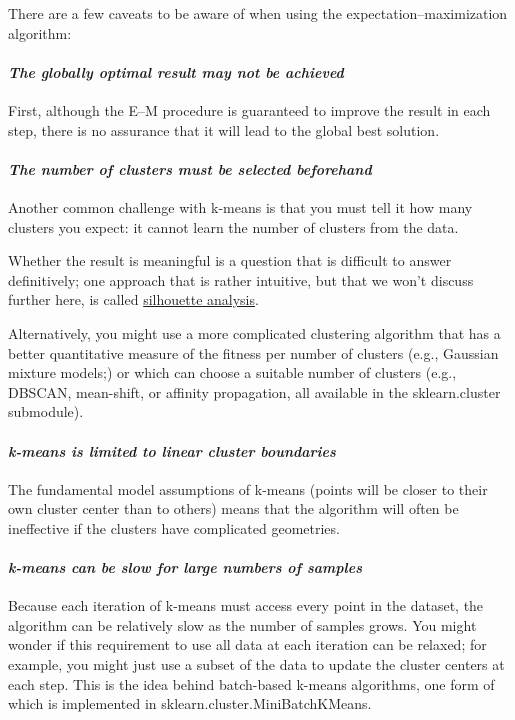 There are a few caveats to be aware of when using the expectation–maximization
algorithm:
\paragraph{\textit{The globally optimal result may not be achieved}} First, although the E–M procedure is guaranteed to improve the result in each
step, there is no assurance that it will lead to the global best solution.

\paragraph{\textit{The number of clusters must be selected beforehand}} Another common challenge with k-means is that you must tell it how many clusters you expect: it cannot learn the number of clusters from the data.

Whether the result is meaningful is a question that is difficult to answer definitively; one approach that is rather intuitive, but that we won’t discuss further
here, is called \href{https://scikit-learn.org/stable/auto_examples/cluster/plot_kmeans_silhouette_analysis.html}{silhouette analysis}.

Alternatively, you might use a more complicated clustering algorithm that has a
better quantitative measure of the fitness per number of clusters (e.g., Gaussian
mixture models;) or which can choose a suitable number of clusters (e.g., DBSCAN, mean-shift, or affinity propagation, all available in the
sklearn.cluster submodule).

\paragraph{\textit{k-means is limited to linear cluster boundaries}} The fundamental model assumptions of k-means (points will be closer to their own cluster center than to others) means that the algorithm will often be ineffective if the clusters have complicated geometries.


\paragraph{\textit{k-means can be slow for large numbers of samples}} Because each iteration of k-means must access every point in the dataset, the
algorithm can be relatively slow as the number of samples grows. You might
wonder if this requirement to use all data at each iteration can be relaxed; for
example, you might just use a subset of the data to update the cluster centers at
each step. This is the idea behind batch-based k-means algorithms, one form of
which is implemented in sklearn.cluster.MiniBatchKMeans.